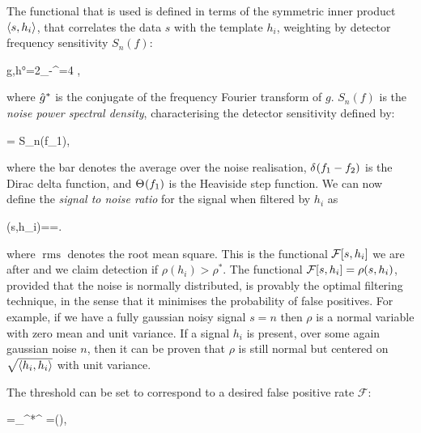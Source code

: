 \documentclass[
  11pt,
  a4paper,
  DIV=11,
  numbers=noendperiod,
  twoside]{scrreprt}
\let\[\relax \let\]\relax %
\DeclareRobustCommand{\[}{\begin{equation}}
\DeclareRobustCommand{\]}{\end{equation}}
\begin{document}
The functional that is used is defined in terms of the symmetric inner
product \(\ang{s,h_i}\), that correlates the data \(s\) with the
template \(h_i\), weighting by detector frequency sensitivity
\(S_n(f)\):

\[\ang{g,h}=2\int\limits_{-\infty}^{\infty}=4 ,\]

where \(\conj{\ft{g}{2\pi}}\) is the conjugate of the frequency Fourier
transform of \(g\). \(S_n(f)\) is the \emph{noise power spectral
density}, characterising the detector sensitivity defined by:

\[
=\half {} S_n(f_1),
\]

where the bar denotes the average over the noise realisation,
\(\deltafn{f_1-f_2}\) is the Dirac delta function, and \(\thetafn{f_1}\)
is the Heaviside step function. We can now define the \emph{signal to
noise ratio} for the signal when filtered by \(h_i\) as 

\[
\rho (s,h_i)==.
\]

where \(\operatorname{rms}\) denotes the root mean square. This is the
functional \(\mathcal{F}\brc{s,h_i}\) we are after and we claim
detection if \(\rho(h_i)>\rho^*\). The functional
\(\mathcal{F}\brc{s,h_i}=\rho (s,h_i)\), provided that the noise is
normally distributed, is provably the optimal filtering technique, in
the sense that it minimises the probability of false positives. For
example, if we have a fully gaussian noisy signal \(s=n\) then \(\rho\)
is a normal variable with zero mean and unit variance. If a signal
\(h_i\) is present, over some again gaussian noise \(n\), then it can be
proven that \(\rho\) is still normal but centered on
\(\sqrt{\ang{h_i,h_i}}\) with unit variance.

The threshold can be set to correspond to a desired false positive rate
\(\mathcal{F}\):

\[=\sqrt{\inv{2\pi}}\int\limits_{\rho^*}^{\infty} \dd{\rho}=\half {}(),\]
\end{document}
